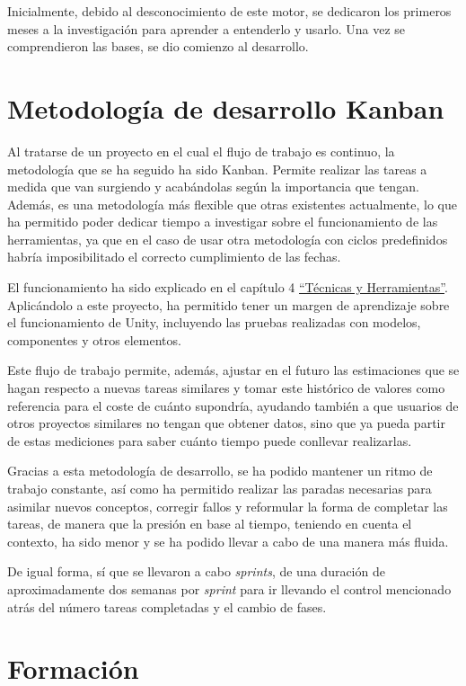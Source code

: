 Inicialmente, debido al desconocimiento de este motor, se dedicaron los primeros meses a la investigación para aprender a entenderlo y usarlo. Una vez se comprendieron las bases, se dio comienzo al desarrollo.

\section{Metodología de desarrollo Kanban}

Al tratarse de un proyecto en el cual el flujo de trabajo es continuo, la metodología que se ha seguido ha sido Kanban. Permite realizar las tareas a medida que van surgiendo y acabándolas según la importancia que tengan. Además, es una metodología más flexible que otras existentes actualmente, lo que ha permitido poder dedicar tiempo a investigar sobre el funcionamiento de las herramientas, ya que en el caso de usar otra metodología con ciclos predefinidos habría imposibilitado el correcto cumplimiento de las fechas.

El funcionamiento ha sido explicado en el capítulo 4 \hyperref[cap:tecnicas]{``Técnicas y Herramientas''}. Aplicándolo a este proyecto, ha permitido tener un margen de aprendizaje sobre el funcionamiento de Unity, incluyendo las pruebas realizadas con modelos, componentes y otros elementos.

Este flujo de trabajo permite, además, ajustar en el futuro las estimaciones que se hagan respecto a nuevas tareas similares y tomar este histórico de valores como referencia para el coste de cuánto supondría, ayudando también a que usuarios de otros proyectos similares no tengan que obtener datos, sino que ya pueda partir de estas mediciones para saber cuánto tiempo puede conllevar realizarlas.

Gracias a esta metodología de desarrollo, se ha podido mantener un ritmo de trabajo constante, así como ha permitido realizar las paradas necesarias para asimilar nuevos conceptos, corregir fallos y reformular la forma de completar las tareas, de manera que la presión en base al tiempo, teniendo en cuenta el contexto, ha sido menor y se ha podido llevar a cabo de una manera más fluida.

De igual forma, sí que se llevaron a cabo \textit{sprints}, de una duración de aproximadamente dos semanas por \textit{sprint} para ir llevando el control mencionado atrás del número tareas completadas y el cambio de fases.

\section{Formación}

